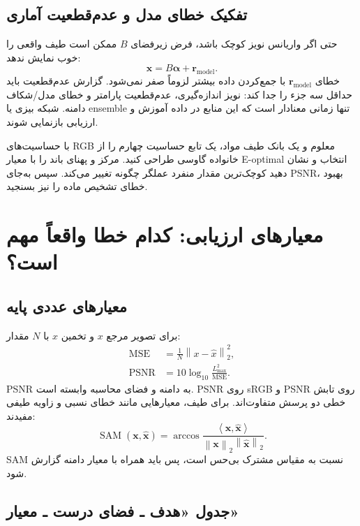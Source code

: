 \documentclass[12pt,openany,oneside]{book}
\newcommand{\norm}[1]{\left\lVert #1\right\rVert}
\newcommand{\inner}[2]{\left\langle #1,#2\right\rangle}
\newcommand{\vect}[1]{\bm{#1}}
\begin{document}
\subsection{تفکیک خطای مدل و عدم‌قطعیت آماری}

حتی اگر واریانس نویز کوچک باشد، فرض زیر‌فضای \(B\) ممکن است طیف واقعی را خوب نمایش ندهد:
\begin{equation}
\vect x=B\vect\alpha+\vect r_{\mathrm{model}}.
\end{equation}
خطای \(\vect r_{\mathrm{model}}\) با جمع‌کردن داده بیشتر لزوماً صفر نمی‌شود. گزارش عدم‌قطعیت باید
حداقل سه جزء را جدا کند: نویز اندازه‌گیری، عدم‌قطعیت پارامتر و خطای مدل/شکاف دامنه. شبکه بیزی یا
ensemble تنها زمانی معنادار است که این منابع در داده آموزش و ارزیابی بازنمایی شوند.

\begin{researchbox}
با حساسیت‌های RGB معلوم و یک بانک طیف مواد، یک تابع حساسیت چهارم را از خانواده گاوسی طراحی کنید.
مرکز و پهنای باند را با معیار E-optimal انتخاب و نشان دهید کوچک‌ترین مقدار منفرد عملگر چگونه تغییر
می‌کند. سپس به‌جای PSNR، بهبود خطای تشخیص ماده را نیز بسنجید.
\end{researchbox}

\section{معیارهای ارزیابی: کدام خطا واقعاً مهم است؟}

\subsection{معیارهای عددی پایه}

برای تصویر مرجع \(x\) و تخمین \(\widehat x\) با \(N\) مقدار:
\begin{align}
\operatorname{MSE}&=\frac1N\norm{x-\widehat x}_2^2,\\
\operatorname{PSNR}&=10\log_{10}\frac{L_{\max}^2}{\operatorname{MSE}}.
\end{align}
PSNR به دامنه و فضای محاسبه وابسته است. PSNR روی sRGB و PSNR روی تابش خطی دو پرسش متفاوت‌اند.
برای طیف، معیارهایی مانند خطای نسبی و زاویه طیفی مفیدند:
\begin{equation}
\operatorname{SAM}(\vect x,\widehat{\vect x})
=\arccos\frac{\inner{\vect x}{\widehat{\vect x}}}
{\norm{\vect x}_2\norm{\widehat{\vect x}}_2}.
\end{equation}
SAM نسبت به مقیاس مشترک بی‌حس است، پس باید همراه با معیار دامنه گزارش شود.

\subsection{جدول «هدف ـ فضای درست ـ معیار»}
\end{document}
